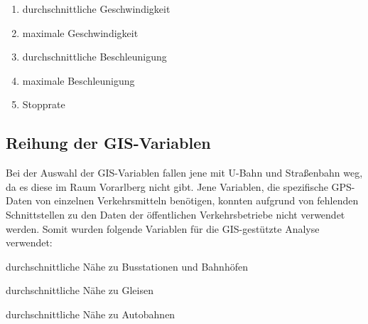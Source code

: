 \begin{enumerate}
\item durchschnittliche Geschwindigkeit
\item maximale Geschwindigkeit
\item durchschnittliche Beschleunigung
\item maximale Beschleunigung
\item Stopprate
\end{enumerate}


\subsection{Reihung der GIS-Variablen}
Bei der Auswahl der GIS-Variablen fallen jene mit U-Bahn und Straßenbahn weg, da es diese im Raum Vorarlberg nicht gibt. Jene Variablen, die spezifische GPS-Daten von einzelnen Verkehrsmitteln benötigen, konnten aufgrund von fehlenden Schnittstellen zu den Daten der öffentlichen Verkehrsbetriebe nicht verwendet werden. Somit wurden folgende Variablen für die GIS-gestützte Analyse verwendet:

\begin{pitemize}
\item durchschnittliche Nähe zu Busstationen und Bahnhöfen
\item durchschnittliche Nähe zu Gleisen	
\item durchschnittliche Nähe zu Autobahnen
\end{pitemize}
\clearpage

